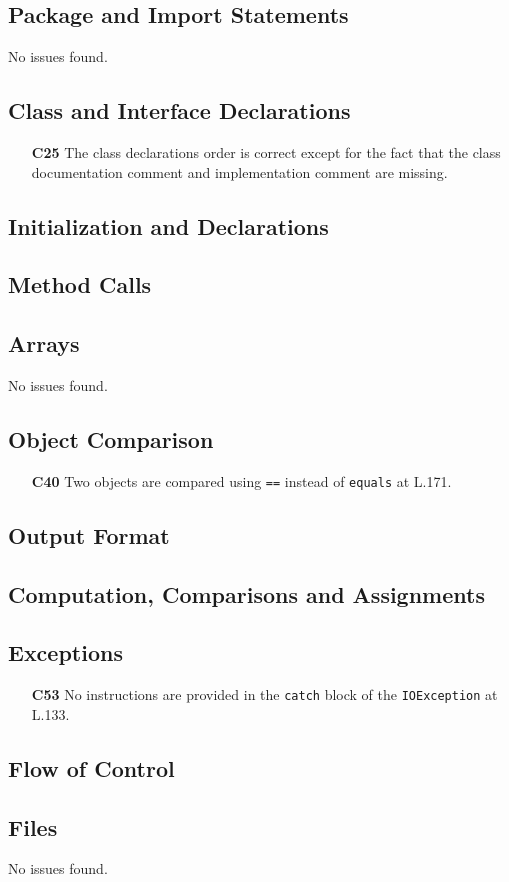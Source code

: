 \subsection{Package and Import Statements}
No issues found.

\subsection{Class and Interface Declarations}
	\begin{itemize}
		\item[\textbf{C25}] The class declarations order is correct except for the fact that the class documentation comment and implementation comment are missing.
	\end{itemize}

\subsection{Initialization and Declarations}
\blindtext

\subsection{Method Calls}
\blindtext

\subsection{Arrays}
No issues found.

\subsection{Object Comparison}
	\begin{itemize}
		\item[\textbf{C40}] Two objects are compared using \texttt{==} instead of \texttt{equals} at L.171.
	\end{itemize}

\subsection{Output Format}
\blindtext

\subsection{Computation, Comparisons and Assignments}
\blindtext

\subsection{Exceptions}
	\begin{itemize}
		\item[\textbf{C53}] No instructions are provided in the \texttt{catch} block of the \texttt{IOException} at L.133.
	\end{itemize}

\subsection{Flow of Control}
\blindtext

\subsection{Files}
No issues found.
